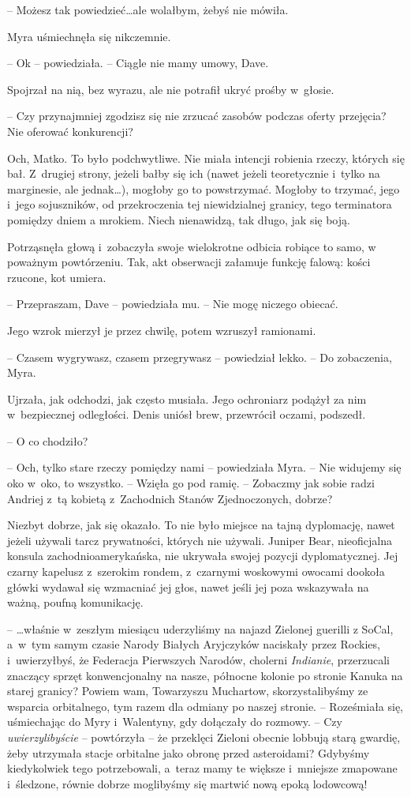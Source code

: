 \documentclass[oneside,polish,11pt,sfheadings]{mwbk}
\begin{document}
-- Możesz tak
powiedzieć\ldots ale wolałbym, żebyś nie mówiła.

Myra uśmiechnęła się nikczemnie. 

-- Ok -- powiedziała. -- Ciągle nie mamy
umowy, Dave.

Spojrzał na nią, bez wyrazu, ale nie potrafił ukryć prośby w~głosie. 

-- Czy przynajmniej zgodzisz się nie zrzucać zasobów podczas oferty
przejęcia? Nie oferować konkurencji?

Och, Matko. To było podchwytliwe. Nie miała intencji robienia rzeczy,
których się bał. Z~drugiej strony, jeżeli bałby się ich (nawet jeżeli
teoretycznie i~tylko na marginesie, ale jednak\ldots), mogłoby go to
powstrzymać. Mogłoby to trzymać, jego i~jego sojuszników, od
przekroczenia tej niewidzialnej granicy, tego terminatora pomiędzy dniem
a mrokiem. Niech nienawidzą, tak długo, jak się boją.

Potrząsnęła głową i~zobaczyła swoje wielokrotne odbicia robiące to samo,
w poważnym powtórzeniu. Tak, akt obserwacji załamuje funkcję falową:
kości rzucone, kot umiera.

-- Przepraszam, Dave -- powiedziała mu. -- Nie mogę niczego obiecać.

Jego wzrok mierzył je przez chwilę, potem wzruszył ramionami.

-- Czasem wygrywasz, czasem przegrywasz -- powiedział lekko. -- Do
zobaczenia, Myra.

Ujrzała, jak odchodzi, jak często musiała. Jego ochroniarz podążył za
nim w~bezpiecznej odległości. Denis uniósł brew, przewrócił oczami,
podszedł.

-- O co chodziło?

-- Och, tylko stare rzeczy pomiędzy nami -- powiedziała Myra. -- Nie
widujemy się oko w~oko, to wszystko. -- Wzięła go pod ramię. -- Zobaczmy
jak sobie radzi Andriej z~tą kobietą z~Zachodnich Stanów Zjednoczonych,
dobrze?

Niezbyt dobrze, jak się okazało. To nie było miejsce na tajną
dyplomację, nawet jeżeli używali tarcz prywatności, których nie używali.
Juniper Bear, nieoficjalna konsula zachodnioamerykańska, nie ukrywała
swojej pozycji dyplomatycznej. Jej czarny kapelusz z~szerokim rondem, z~czarnymi woskowymi owocami dookoła główki wydawał się wzmacniać jej
głos, nawet jeśli jej poza wskazywała na ważną, poufną komunikację.

-- \ldots właśnie w~zeszłym miesiącu uderzyliśmy na najazd Zielonej guerilli
z SoCal, a~w~tym samym czasie Narody Białych Aryjczyków naciskały przez
Rockies, i~uwierzyłbyś, że Federacja Pierwszych Narodów, cholerni
\textit{Indianie}, przerzucali znaczący sprzęt konwencjonalny na nasze,
północne kolonie po stronie Kanuka na starej granicy? Powiem wam,
Towarzyszu Muchartow, skorzystalibyśmy ze wsparcia orbitalnego, tym
razem dla odmiany po naszej stronie. -- Roześmiała się, uśmiechając do
Myry i~Walentyny, gdy dołączały do rozmowy. -- Czy \textit{uwierzylibyście}
-- powtórzyła -- że przeklęci Zieloni obecnie lobbują starą gwardię, żeby
utrzymała stacje orbitalne jako obronę przed asteroidami? Gdybyśmy
kiedykolwiek tego potrzebowali, a~teraz mamy te większe i~mniejsze
zmapowane i~śledzone, równie dobrze moglibyśmy się martwić nową epoką
lodowcową!
\end{document}
